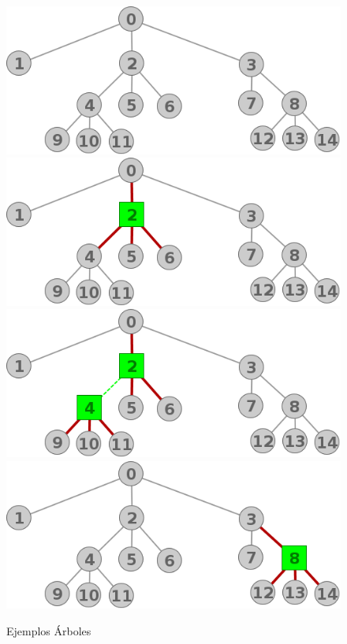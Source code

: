 \begin{figure}[H]
\caption{Ejemplos \'Arboles}
\centering
\includegraphics[scale = 0.5]{img/ej3/constructiva_golosa/tree_st0.png}
\includegraphics[scale = 0.5]{img/ej3/constructiva_golosa/tree_st01.png}
\includegraphics[scale = 0.5]{img/ej3/constructiva_golosa/tree_st02.png}
\includegraphics[scale = 0.5]{img/ej3/constructiva_golosa/tree_st11.png}

\end{figure}
